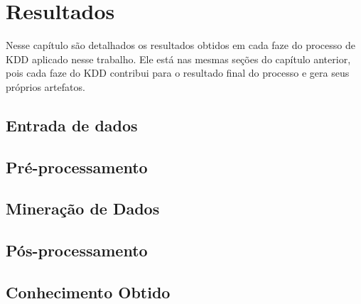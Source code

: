 \chapter{Resultados}

Nesse capítulo são detalhados os resultados obtidos em cada faze do processo de
KDD aplicado nesse trabalho. Ele está nas mesmas seções do capítulo anterior,
pois cada faze do KDD contribui para o resultado final do processo e gera seus
próprios artefatos.

\section{Entrada de dados}

\section{Pré-processamento}

\section{Mineração de Dados}

\section{Pós-processamento}

\section{Conhecimento Obtido}
